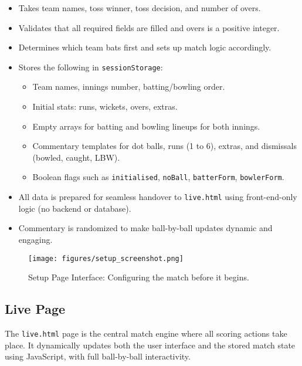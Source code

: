 \documentclass[a4paper,10pt]{article}
\begin{document}
\begin{itemize}
    \item Takes team names, toss winner, toss decision, and number of overs.
    \item Validates that all required fields are filled and overs is a positive integer.
    \item Determines which team bats first and sets up match logic accordingly.
    \item Stores the following in \texttt{sessionStorage}:
    \begin{itemize}
        \item Team names, innings number, batting/bowling order.
        \item Initial stats: runs, wickets, overs, extras.
        \item Empty arrays for batting and bowling lineups for both innings.
        \item Commentary templates for dot balls, runs (1 to 6), extras, and dismissals (bowled, caught, LBW).
        \item Boolean flags such as \texttt{initialised}, \texttt{noBall}, \texttt{batterForm}, \texttt{bowlerForm}.
    \end{itemize}
    \item All data is prepared for seamless handover to \texttt{live.html} using front-end-only logic (no backend or database).
    \item Commentary is randomized to make ball-by-ball updates dynamic and engaging.
\end{itemize}

\begin{figure}[h]
    \centering
    \texttt{[image: figures/setup\_screenshot.png]}
    \caption{Setup Page Interface: Configuring the match before it begins.}
    \label{fig:setup}
\end{figure}


\subsection{Live Page}

The \texttt{live.html} page is the central match engine where all scoring actions take place. It dynamically updates both the user interface and the stored match state using JavaScript, with full ball-by-ball interactivity.
\end{document}
